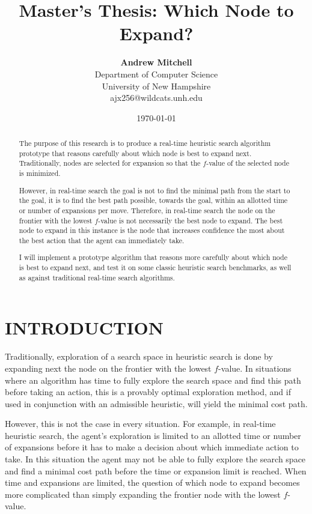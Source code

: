 \documentclass[letterpaper, 11 pt, conference]{ieeeconf}  %
\title{\LARGE \bf
Master's Thesis: Which Node to Expand?
}
\author{ {\bf Andrew Mitchell}  \\
	Department of Computer Science \\
	University of New Hampshire\\
	{\small ajx256@wildcats.unh.edu}
}
\date{\today}
\begin{document}
\maketitle
\thispagestyle{empty}
\pagestyle{empty}


\begin{abstract}

The purpose of this research is to produce a real-time heuristic search algorithm prototype that reasons carefully about which node is best to expand next. Traditionally, nodes are selected for expansion so that the $f$-value of the selected node is minimized.

However, in real-time search the goal is not to find the minimal path from the start to the goal, it is to find the best path possible, towards the goal, within an allotted time or number of expansions per move. Therefore, in real-time search the node on the frontier with the lowest $f$-value is not necessarily the best node to expand. The best node to expand in this instance is the node that increases confidence the most about the best action that the agent can immediately take. 

I will implement a prototype algorithm that reasons more carefully about which node is best to expand next, and test it on some classic heuristic search benchmarks, as well as against traditional real-time search algorithms.
\end{abstract}


\section{INTRODUCTION}

Traditionally, exploration of a search space in heuristic search is done by expanding next the node on the frontier with the lowest $f$-value. In situations where an algorithm has time to fully explore the search space and find this path before taking an action, this is a provably optimal exploration method, and if used in conjunction with an admissible heuristic, will yield the minimal cost path. \cite{DBLP:journals/tssc/HartNR68} \cite{DBLP:journals/jacm/DechterP85}

However, this is not the case in every situation. For example, in real-time heuristic search, the agent's exploration is limited to an allotted time or number of expansions before it has to make a decision about which immediate action to take. In this situation the agent may not be able to fully explore the search space and find a minimal cost path before the time or expansion limit is reached. When time and expansions are limited, the question of which node to expand becomes more complicated than simply expanding the frontier node with the lowest $f$-value.
\end{document}
